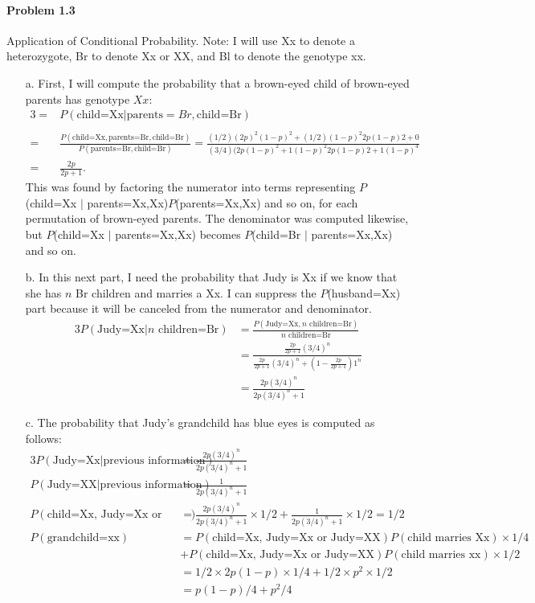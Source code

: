 \documentclass[10pt]{article}
\begin{document}
\paragraph{Problem 1.3} Application of Conditional Probability. Note: I will use Xx to denote a heterozygote, Br to denote Xx or XX, and Bl to denote the genotype xx.
\begin{enumerate}
\item[a.] First, I will compute the probability that a brown-eyed child of brown-eyed parents has genotype $Xx$:
\begin{alignat*}{3}
=&P(\text{child=Xx} | \text{parents}=Br, \text{child=Br}) \\ \\
=&\frac{P(\text{child=Xx}, \text{parents=Br}, \text{child=Br})}{P(\text{parents=Br}, \text{child=Br})}=\frac{(1/2)(2p)^2(1-p)^2+(1/2)(1-p)^2 2p(1-p)2 + 0}{(3/4)(2p(1-p)^2+1(1-p)^2 2p(1-p)2+1(1-p)^4} \\
=& \frac{2p}{2p+1}.
\end{alignat*}
This was found by factoring the numerator into terms representing $P$(child=Xx $|$ parents=Xx,Xx)$P$(parents=Xx,Xx) and so on, for each permutation of brown-eyed parents. The denominator was computed likewise, but $P$(child=Xx $|$ parents=Xx,Xx) becomes $P$(child=Br $|$ parents=Xx,Xx) and so on.

\item[b.] In this next part, I need the probability that Judy is Xx if we know that she has $n$ Br children and marries a Xx. I can suppress the $P$(husband=Xx) part because it will be canceled from the numerator and denominator.
\begin{alignat*}{3}
P(\text{Judy=Xx}|n \text{ children=Br})&=\frac{P(\text{Judy=Xx},n \text{ children=Br})}{n \text{ children=Br}} \\
&=\frac{\frac{2p}{2p+1}(3/4)^n}{\frac{2p}{2p+1}(3/4)^n+\left(1-\frac{2p}{2p+1}\right)1^n} \\
&=\frac{2p(3/4)^n}{2p(3/4)^n+1} 
\end{alignat*}

\item[c.] The probability that Judy's grandchild has blue eyes is computed as follows:
\begin{alignat*}{3}
P(\text{Judy=Xx} | \text{previous information})&=\frac{2p(3/4)^n}{2p(3/4)^n+1} \\
P(\text{Judy=XX} | \text{previous information})&=\frac{1}{2p(3/4)^n+1} \\
P(\text{child=Xx, Judy=Xx or Judy=XX})&=\frac{2p(3/4)^n}{2p(3/4)^n+1} \times 1/2 + \frac{1}{2p(3/4)^n+1} \times 1/2  =1/2 \\
P(\text{grandchild=xx})&=P(\text{child=Xx, Judy=Xx or Judy=XX})P(\text{child marries Xx})\times 1/4 \\ &+ P(\text{child=Xx, Judy=Xx or Judy=XX})P(\text{child marries xx})\times 1/2 \\
&=1/2 \times 2p(1-p) \times 1/4 + 1/2 \times p^2 \times 1/2 \\
&=p(1-p)/4 + p^2/4
\end{alignat*}

\end{enumerate}
\end{document}
